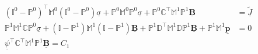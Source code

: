 \documentclass[../master_thesis.tex]{subfiles}
\begin{document}
\begin{align*}
    (\mathbb{I}^0-\mathbb{P}^0)^\top \mathbb{M}^0 
        (\mathbb{I}^0-\mathbb{P}^0)\underline{\sigma} 
        +  \mathbb{P}^0 \mathbb{M}^0 \mathbb{P}^0 \underline{\sigma}
        +  \mathbb{P}^0 \mathbb{C} ^\top \mathbb{M}^1 \mathbb{P}^1 
        \underline{\mathbf{B}} &=  \underline{\tilde{J}} 
    \\ \mathbb{P}^1 \mathbb{M}^1 \mathbb{C} \mathbb{P}^0 \underline{\sigma}
        + (\mathbb{I}-\mathbb{P}^1) \mathbb{M}^1 
        (\mathbb{I}-\mathbb{P}^1)\underline{\mathbf{B}}
        + \mathbb{P}^1 \mathbb{D}^\top \mathbb{M}^1 
        \mathbb{D} \mathbb{P}^1 \underline{\mathbf{B}} + 
        \mathbb{P}^1 \mathbb{M}^1 \underline{\mathbf{p}} &= 0 
    \\ \underline{\psi}^\top \mathbb{C}^\top \mathbb{M}^1 \mathbb{P}^1 \underline{\mathbf{B}} = C_1
\end{align*}
\end{document}
